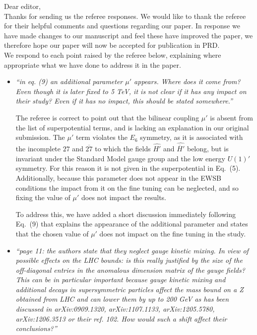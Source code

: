 \documentclass[12pt]{article}
\begin{document}
\noindent Dear editor,
\\

\noindent Thanks for sending us the referee responses. We would like to thank
the referee for their helpful comments and questions regarding our
paper. In response we have made changes to our manuscript and feel
these have improved the paper, we therefore hope our paper will now be
accepted for publication in PRD.
\\
\noindent We respond to each point raised by the referee below, explaining
where appropriate what we have done to address it in the paper.

\begin{itemize}
\item {\it ``in eq. (9) an additional parameter $\mu'$ appears.  Where
does it come from?  Even though it is later fixed to 5 TeV, it is not
clear if it has any impact on their study?  Even if it has no impact,
this should be stated somewhere.''}

The referee is correct to point out that the bilinear coupling $\mu'$ is
absent from the list of superpotential terms, and is lacking an explanation
in our original submission. The $\mu'$ term violates the $E_6$ symmetry, as
it is associated with the incomplete $27$ and $\overline{27}$ to which the
fields $\hat{H'}$ and $\hat{\overline{H}'}$ belong, but is invariant under
the Standard Model gauge group and the low energy $U(1)'$ symmetry. For this
reason it is not given in the superpotential in Eq.~(5). Additionally, because
this parameter does not appear in the EWSB conditions the impact from it on
the fine tuning can be neglected, and so fixing the value of $\mu'$ does not
impact the results.

To address this, we have added a short discussion immediately
following Eq.~(9) that explains the appearance of the additional parameter
and states that the chosen value of $\mu'$ does not impact on the fine
tuning in the study.

\item {\it ``page 11: the authors state that they neglect gauge kinetic
mixing.  In view of possible effects on the LHC bounds: is this really
justified by the size of the off-diagonal entries in the anomalous
dimension matrix of the gauge fields?  This can be in particular important
because gauge kinetic mixing and additional decays in supersymmetric
particles affect the mass bound on a Z obtained from LHC and can lower them
by up to 200 GeV as has been discussed in arXiv:0909.1320, arXiv:1107.1133,
arXiv:1205.5780, arXiv:1206.3513 or their ref. 102.  How would such a shift
affect their conclusions?''}


\end{itemize}
\end{document}
